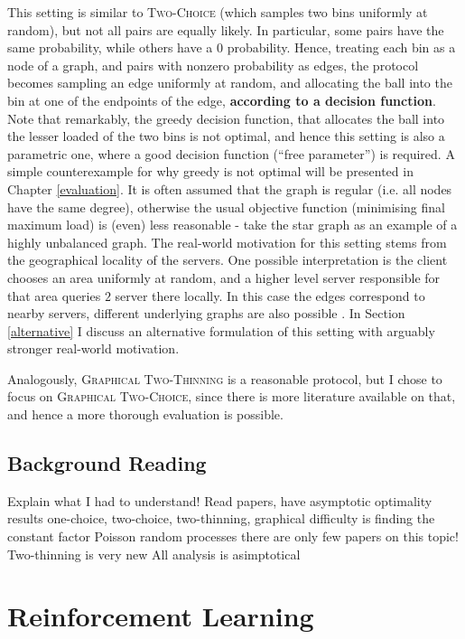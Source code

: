 This setting is similar to \textsc{Two-Choice} (which samples two bins uniformly at random), but not all pairs are equally likely. In particular, some pairs have the same probability, while others have a $0$ probability. Hence, treating each bin as a node of a graph, and pairs with nonzero probability as edges, the protocol becomes sampling an edge uniformly at random, and allocating the ball into the bin at one of the endpoints of the edge, \textbf{according to a decision function}. Note that remarkably, the greedy decision function, that allocates the ball into the lesser loaded of the two bins is not optimal, and hence this setting is also a parametric one, where a good decision function (``free parameter'') is required. A simple counterexample for why greedy is not optimal will be presented in Chapter \ref{evaluation}. It is often assumed that the graph is regular (i.e. all nodes have the same degree), otherwise the usual objective function (minimising final maximum load) is (even) less reasonable - take the star graph as an example of a highly unbalanced graph. The real-world motivation for this setting stems from the geographical locality of the servers. One possible interpretation is the client chooses an area uniformly at random, and a higher level server responsible for that area queries $2$ server there locally. In this case the edges correspond to nearby servers, different underlying graphs are also possible \cite{peres2015oneplusbeta}. In Section \ref{alternative} I discuss an alternative formulation of this setting with arguably stronger real-world motivation.

Analogously, \textsc{Graphical Two-Thinning} is a reasonable protocol, but I chose to focus on \textsc{Graphical Two-Choice}, since there is more literature available on that, and hence a more thorough evaluation is possible. 



\subsection{Background Reading}


Explain what I had to understand!
Read papers, have asymptotic optimality results
one-choice, two-choice, two-thinning, graphical
difficulty is finding the constant factor
Poisson random processes
there are only few papers on this topic!
Two-thinning is very new
All analysis is asimptotical

\section{Reinforcement Learning}


